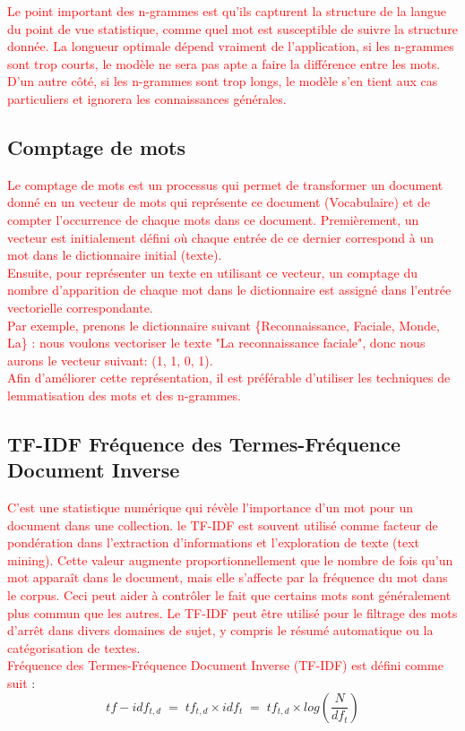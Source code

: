      \textcolor{red}{Le point important des n-grammes est qu'ils capturent la structure de la langue du point de vue statistique, comme quel mot est susceptible de suivre la structure donnée. La longueur optimale dépend vraiment de l'application, si les n-grammes sont trop courts, le modèle ne sera pas apte a faire la différence entre les mots. D'un autre côté, si les n-grammes sont trop longs, le modèle s'en tient aux cas particuliers et ignorera les connaissances générales.}
    
    \subsection{Comptage de mots}
    
     \textcolor{red}{Le comptage de mots est un processus qui permet de transformer un document donné en un vecteur de mots qui représente ce document (Vocabulaire) et de compter l'occurrence de chaque mots dans ce document. Premièrement, un vecteur est initialement défini où chaque entrée de ce dernier correspond à un mot dans le dictionnaire initial (texte).\\ 
    Ensuite, pour représenter un texte en utilisant ce vecteur, un comptage du nombre d'apparition de chaque mot dans le dictionnaire est assigné dans l'entrée vectorielle correspondante.\\ 
    Par exemple, prenons le dictionnaire suivant \{Reconnaissance, Faciale, Monde, La\} :
    nous voulons vectoriser le texte "La reconnaissance faciale", donc nous aurons le vecteur suivant: (1, 1, 0, 1).\\
    Afin d'améliorer cette représentation, il est préférable d'utiliser les techniques de lemmatisation des mots et des n-grammes.}
    
    \subsection{TF-IDF Fréquence des Termes-Fréquence Document Inverse}
    
     \textcolor{red}{C'est une statistique numérique qui révèle l'importance d'un mot pour un document dans une collection. le TF-IDF est souvent utilisé comme facteur de pondération dans l'extraction d'informations et l'exploration de texte (text mining).
    Cette valeur augmente proportionnellement que le nombre de fois qu'un mot apparaît dans le document, mais elle s'affecte par la fréquence du mot dans le corpus. Ceci peut aider à contrôler le fait que certains mots sont généralement plus commun que les autres. Le TF-IDF peut être utilisé pour le filtrage des mots d'arrêt dans divers domaines de sujet, y compris le résumé automatique ou la catégorisation de textes. \\
    Fréquence des Termes-Fréquence Document Inverse (TF-IDF) est défini comme suit} :
    $$
    tf-idf_{t,d} \; = \; tf_{t,d} \times idf_t \; = \; tf_{t,d}
    \times log(\frac{N}{df_t})
    $$
     
